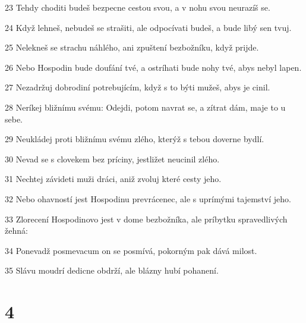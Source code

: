 \par 23 Tehdy choditi budeš bezpecne cestou svou, a v nohu svou neurazíš se.
\par 24 Když lehneš, nebudeš se strašiti, ale odpocívati budeš, a bude libý sen tvuj.
\par 25 Nelekneš se strachu náhlého, ani zpuštení bezbožníku, když prijde.
\par 26 Nebo Hospodin bude doufání tvé, a ostríhati bude nohy tvé, abys nebyl lapen.
\par 27 Nezadržuj dobrodiní potrebujícím, když s to býti mužeš, abys je cinil.
\par 28 Neríkej bližnímu svému: Odejdi, potom navrat se, a zítrat dám, maje to u sebe.
\par 29 Neukládej proti bližnímu svému zlého, kterýž s tebou doverne bydlí.
\par 30 Nevad se s clovekem bez príciny, jestližet neucinil zlého.
\par 31 Nechtej závideti muži dráci, aniž zvoluj které cesty jeho.
\par 32 Nebo ohavností jest Hospodinu prevrácenec, ale s uprímými tajemství jeho.
\par 33 Zlorecení Hospodinovo jest v dome bezbožníka, ale príbytku spravedlivých žehná:
\par 34 Ponevadž posmevacum on se posmívá, pokorným pak dává milost.
\par 35 Slávu moudrí dedicne obdrží, ale blázny hubí pohanení.

\chapter{4}

